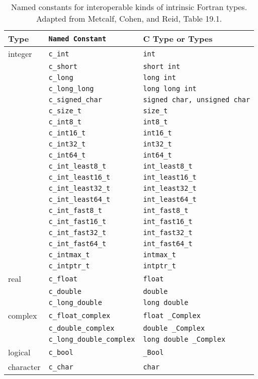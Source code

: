 \begin{table}[h!]
\centering
\begin{tabular}{lll}
\textbf{Type} & \textbf{\texttt{Named Constant}} & \textbf{C Type or Types} \\\hline
integer & \texttt{c\_int} & \texttt{int} \\
 & \texttt{c\_short} & \texttt{short int} \\
 & \texttt{c\_long} & \texttt{long int} \\
 & \texttt{c\_long\_long} & \texttt{long long int} \\
 & \texttt{c\_signed\_char} & \texttt{signed char, unsigned char} \\
 & \texttt{c\_size\_t} & \texttt{size\_t} \\
 & \texttt{c\_int8\_t} & \texttt{int8\_t} \\
 & \texttt{c\_int16\_t} & \texttt{int16\_t} \\
 & \texttt{c\_int32\_t} & \texttt{int32\_t} \\
 & \texttt{c\_int64\_t} & \texttt{int64\_t} \\
 & \texttt{c\_int\_least8\_t} & \texttt{int\_least8\_t} \\
 & \texttt{c\_int\_least16\_t} & \texttt{int\_least16\_t} \\
 & \texttt{c\_int\_least32\_t} & \texttt{int\_least32\_t} \\
 & \texttt{c\_int\_least64\_t} & \texttt{int\_least64\_t} \\
 & \texttt{c\_int\_fast8\_t} & \texttt{int\_fast8\_t} \\
 & \texttt{c\_int\_fast16\_t} & \texttt{int\_fast16\_t} \\
 & \texttt{c\_int\_fast32\_t} & \texttt{int\_fast32\_t} \\
 & \texttt{c\_int\_fast64\_t} & \texttt{int\_fast64\_t} \\
 & \texttt{c\_intmax\_t} & \texttt{intmax\_t} \\
 & \texttt{c\_intptr\_t} & \texttt{intptr\_t} \\[3pt]
real & \texttt{c\_float} & \texttt{float} \\
 & \texttt{c\_double} & \texttt{double} \\
 & \texttt{c\_long\_double} & \texttt{long double} \\[3pt]
complex & \texttt{c\_float\_complex} & \texttt{float \_Complex} \\
 & \texttt{c\_double\_complex} & \texttt{double \_Complex} \\
 & \texttt{c\_long\_double\_complex} & \texttt{long double \_Complex} \\[3pt]
logical & \texttt{c\_bool} & \texttt{\_Bool} \\[3pt]
character & \texttt{c\_char} & \texttt{char} \\
\end{tabular}
\caption{Named constants for interoperable kinds of intrinsic Fortran types. Adapted from Metcalf, Cohen, and Reid, Table 19.1.}
\label{tab:fortran_c_interop}
\end{table}

